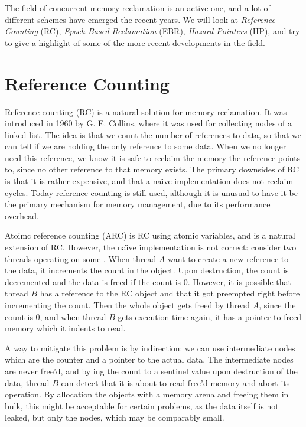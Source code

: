 \documentclass[b5paper]{report}
\begin{document}
The field of concurrent memory reclamation is an active one, and a lot of
different schemes have emerged the recent years. We will look at \emph{Reference
Counting} (RC), \emph{Epoch Based Reclamation} (EBR), \emph{Hazard Pointers}
(HP), and try to give a highlight of some of the more recent developments in the
field.

\section{Reference Counting}
Reference counting (RC) is a natural solution for memory reclamation. It was
introduced in 1960 by G. E.  Collins\cite{collins1960method}, where it was used
for collecting nodes of a linked list.  The idea is that we count the number of
references to data, so that we can tell if we are holding the only reference to
some data. When we no longer need this reference, we know it is safe to reclaim
the memory the reference points to, since no other reference to that memory
exists. The primary downsides of RC is that it is rather expensive, and that a
na\"\i{}ve implementation does not reclaim cycles. Today reference counting is
still used, although it is unusual to have it be the primary mechanism for
memory management, due to its performance overhead.

Atoimc reference counting (ARC) is RC using atomic variables, and is a natural
extension of RC\@. However, the na\"\i{}ve implementation is not correct:
consider two threads operating on some . When thread $A$ want to
create a new reference to the data, it increments the count in the 
object. Upon destruction, the count is decremented and the data is freed if the
count is 0. However, it is possible that thread $B$ has a reference to the RC
object and that it got preempted right before incrementing the count. Then the
whole object gets freed by thread $A$, since the count is 0, and when thread $B$
gets execution time again, it has a pointer to freed memory which it indents to
read.

A way to mitigate this problem is by indirection: we can use intermediate
 nodes which are the counter and a pointer to the actual data. The
intermediate nodes are never free'd, and by ing the count to a
sentinel value upon destruction of the data, thread $B$ can detect that it is
about to read free'd memory and abort its operation. By allocation the 
objects with a memory arena and freeing them in bulk, this might be acceptable
for certain problems, as the data itself is not leaked, but only the 
nodes, which may be comparably small.
\end{document}

